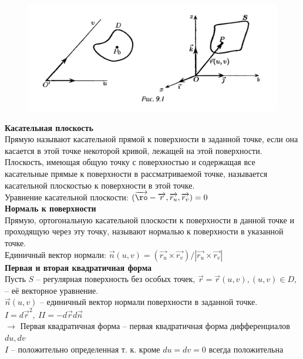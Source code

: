 \documentclass{report}
\begin{document}
\begin{figure}[ht!]
\centering
\includegraphics[width=120mm]{curve8.png}
\end{figure}

\newpage
\noindent
\textbf{Касательная плоскость}\\
Прямую называют касательной прямой к поверхности в заданной точке, если она касается
в этой точке некоторой кривой, лежащей на этой поверхности.\\
Плоскость, имеющая общую точку с поверхностью и содержащая все касательные прямые к
поверхности в рассматриваемой точке, называется касательной плоскостью к
поверхности в этой точке.\\
Уравнение касательной плоскости: 
$(\overrightarrow{\ro} - \overrightarrow{r}, \overrightarrow{r_u}, \overrightarrow{r_v}) = 0$\\

\noindent
\textbf{Нормаль к поверхности}\\
Прямую, ортогональную касательной плоскости к поверхности в данной точке и проходящую через
эту точку, называют нормалью к поверхности в указанной точке.\\
Единичный вектор нормали: $\overrightarrow{n}(u, v) = (\overrightarrow{r_u} \times
\overrightarrow{r_v})/|\overrightarrow{r_u} \times \overrightarrow{r_v}|$\\

\noindent
\textbf{Первая и вторая квадратичная форма}\\
Пусть $S$ -- регулярная поверхность без особых точек, $\overrightarrow{r} = 
\overrightarrow{r}(u, v), (u, v) \in D$, -- её векторное уравнение.\\
$\overrightarrow{n}(u, v)$ -- единичный вектор нормали поверхности в заданной точке.\\
$I = d\overrightarrow{r}^2,\ II = - d\overrightarrow{r} d\overrightarrow{n}$\\
$\to$ Первая квадратичная форма -- первая квадратичная форма дифференциалов $du, dv$\\
$I$ -- положительно определенная т. к. кроме $du = dv = 0$ всегда положительна
\end{document}
